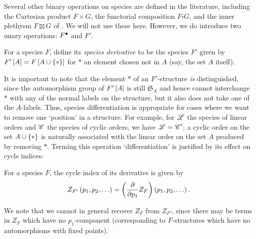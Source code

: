 \documentclass[sectionflow,singlespace,twoside]{brandiss} %
\numberwithin{section}{chapter}
\numberwithin{figure}{chapter}
\begin{document}
Several other binary operations on species are defined in the literature, including the Cartesian product $F \times G$, the functorial composition $F \square G$, and the inner plethysm $F \boxtimes G$ of \cite{travis:inpleth}.
We will not use these here.
However, we do introduce two unary operations: ${F}^{\bullet }$ and $F'$.

\begin{definition}
  \label{def:specderiv}
  For a species $F$, define its \emph{species derivative} to be the species $F'$ given by $F' \left[ {A} \right] = F \left[ {A \cup \left\{ {*} \right\}} \right]$ for $*$ an element chosen not in $A$ (say, the set $A$ itself).
\end{definition}
It is important to note that the element $*$ of an $F'$-structure \emph{is} distinguished, since the automorphism group of $F' \left[ {A} \right]$ is still $\mathfrak{S}_{A}$ and hence cannot interchange $*$ with any of the normal labels on the structure, but it also does not take one of the $A$-labels.
Thus, species differentiation is appropriate for cases where we want to remove one `position' in a structure.
For example, for $\mathscr{L}$ the species of linear orders and $\mathscr{C}$ the species of cyclic orders, we have $\mathscr{L} = \mathscr{C}'$; a cyclic order on the set $A \cup \left\{ {*} \right\}$ is naturally associated with the linear order on the set $A$ produced by removing $*$.
Terming this operation `differentiation' is justified by its effect on cycle indices:
\begin{theorem}
  \label{thm:specderivci}
  For a species $F$, the cycle index of its derivative is given by
  \begin{equation}
    \label{eq:specderivci}
    Z_{F'} \left( {p_{1}, p_{2}, \dots} \right) = \left( {\frac{\partial}{\partial p_{1}} Z_{F}} \right) \left( {p_{1}, p_{2}, \dots} \right).
  \end{equation}
\end{theorem}
We note that we cannot in general recover $Z_{F}$ from $Z_{F'}$, since there may be terms in $Z_{F}$ which have no $p_{1}$-component (corresponding to $F$-structures which have no automorphisms with fixed points).
\end{document}
